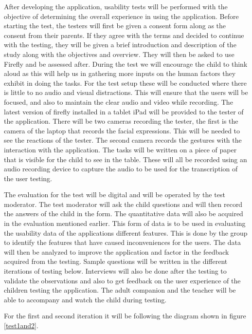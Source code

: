 After developing the application, usability tests will be performed with the objective of determining the overall experience in using the application. Before starting the test, the testers will first be given a consent form along as the consent from their parents. If they agree with the terms and decided to continue with the testing, they will be given a brief introduction and description of the study along with the objectives and overview. They will then be asked to use Firefly and be assessed after. During the test we will encourage the child to think aloud as this will help us in gathering more inputs on the human factors they exhibit in doing the tasks. For the test setup these will be conducted where there is little to no audio and visual distractions. This will ensure that the users will be focused, and also to maintain the clear audio and video while recording. The latest version of firefly installed in a tablet iPad will be provided to the tester of the application. There will be two cameras recording the tester, the first is the camera of the laptop that records the facial expressions. This will be needed to see the reactions of the tester. The second camera records the gestures with the interaction with the application. The tasks will be written on a piece of paper that is visible for the child to see in the table. These will all be recorded using an audio recording device to capture the audio to be used for the transcription of the user testing. 

The evaluation for the test will be digital and will be operated by the test moderator. The test moderator will ask the child questions and will then record the answers of the child in the form. The quantitative data will also be acquired in the evaluation mentioned earlier. This form of data is to be used in evaluating the usability data of the applications different features. This is done by the group to identify the features that have caused inconveniences for the users. The data will then be analyzed to improve the application and factor in the feedback acquired from the testing. Sample questions will be written in the different iterations of testing below. Interviews will also be done after the testing to validate the observations and also to get feedback on the user experience of the children testing the application. The adult companion and the teacher will be able to accompany and watch the child during testing.

For the first and second iteration it will be following the diagram shown in figure \ref{test1and2}.

